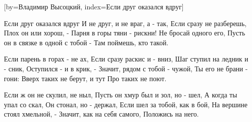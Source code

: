 [by={Владимир Высоцкий},
                     index={Если друг оказался вдруг}]
\beginverse

Если друг оказался вдруг
И не друг, и не враг, а - так,
Если сразу не разберешь,
Плох он или хорош, -
Парня в горы тяни - рискни!
Не бросай одного его,
Пусть он в связке в одной с тобой -
Там поймешь, кто такой.

\endverse
\beginverse

Если парень в горах - не ах,
Если сразу раскис и - вниз,
Шаг ступил на ледник и - сник,
Оступился - и в крик, -
Значит, рядом с тобой - чужой,
Ты его не брани - гони:
Вверх таких не берут, и тут
Про таких не поют.

\endverse
\beginverse

Если ж он не скулил, не ныл,
Пусть он хмур был и зол, но - шел,
А когда ты упал со скал,
Он стонал, но - держал,
Если шел за тобой, как в бой,
На вершине стоял хмельной, -
Значит, как на себя самого,
Положись на него.

\endverse
\endsong
